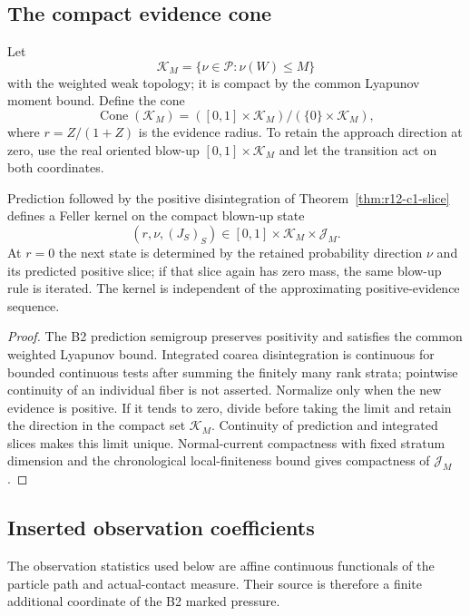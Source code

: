 \subsection{The compact evidence cone}

Let
\[
 \mathcal K_M=\{\nu\in\mathcal P: \nu(W)\le M\}
\]
with the weighted weak topology; it is compact by the common Lyapunov moment
bound.  Define the cone
\[
 \operatorname{Cone}(\mathcal K_M)
 =([0,1]\times\mathcal K_M)/(\{0\}\times\mathcal K_M),
\]
where $r=Z/(1+Z)$ is the evidence radius.  To retain the approach direction at
zero, use the real oriented blow-up
$[0,1]\times\mathcal K_M$ and let the transition act on both coordinates.

\begin{theorem}
\label{thm:r12-c1-feller}
Prediction followed by the positive disintegration of
Theorem~\ref{thm:r12-c1-slice} defines a Feller kernel on the compact blown-up
state
\[
 (r,\nu,(J_S)_S)\in[0,1]\times\mathcal K_M\times\mathcal J_M.
\]
At $r=0$ the next state is determined by the retained probability direction
$\nu$ and its predicted positive slice; if that slice again has zero mass, the
same blow-up rule is iterated.  The kernel is independent of the approximating
positive-evidence sequence.
\end{theorem}

\begin{proof}
The B2 prediction semigroup preserves positivity and satisfies the common
weighted Lyapunov bound.  Integrated coarea disintegration is continuous for
bounded continuous tests after summing the finitely many rank strata; pointwise
continuity of an individual fiber is not asserted.  Normalize only when the
new evidence is positive.  If it tends to zero, divide before taking the limit
and retain the direction in the compact set $\mathcal K_M$.  Continuity of
prediction and integrated slices makes this limit unique.  Normal-current
compactness with fixed stratum dimension and the chronological local-finiteness
bound gives compactness of $\mathcal J_M$.
\end{proof}

\subsection{Inserted observation coefficients}

The observation statistics used below are affine continuous functionals of the
particle path and actual-contact measure.  Their source is therefore a finite
additional coordinate of the B2 marked pressure.

